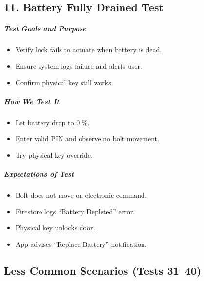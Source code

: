 \subsection*{11. Battery Fully Drained Test}
\subparagraph{Test Goals and Purpose}
\begin{itemize}
    \item Verify lock fails to actuate when battery is dead.
    \item Ensure system logs failure and alerts user.
    \item Confirm physical key still works.
\end{itemize}
\subparagraph{How We Test It}
\begin{itemize}
    \item Let battery drop to 0 \%.
    \item Enter valid PIN and observe no bolt movement.
    \item Try physical key override.
\end{itemize}
\subparagraph{Expectations of Test}
\begin{itemize}
    \item Bolt does not move on electronic command.
    \item Firestore logs “Battery Depleted” error.
    \item Physical key unlocks door.
    \item App advises “Replace Battery” notification.
\end{itemize}

























\newpage
\subsection{Less Common Scenarios (Tests 31–40)}

